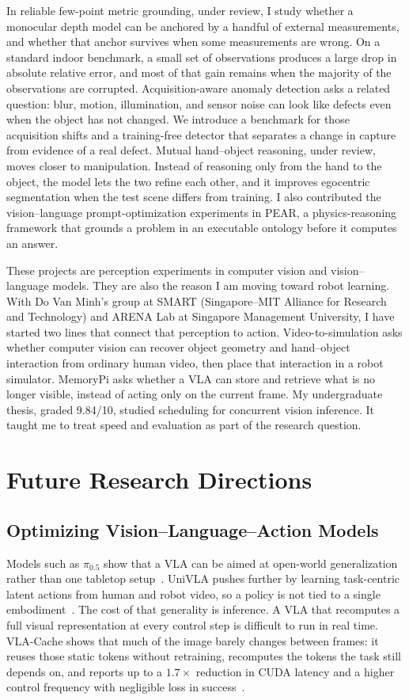 \documentclass[11pt]{article}
\begin{document}
In reliable few-point metric grounding, under review, I study whether a monocular depth model can be anchored by a handful of external measurements, and whether that anchor survives when some measurements are wrong. On a standard indoor benchmark, a small set of observations produces a large drop in absolute relative error, and most of that gain remains when the majority of the observations are corrupted. Acquisition-aware anomaly detection asks a related question: blur, motion, illumination, and sensor noise can look like defects even when the object has not changed. We introduce a benchmark for those acquisition shifts and a training-free detector that separates a change in capture from evidence of a real defect. Mutual hand--object reasoning, under review, moves closer to manipulation. Instead of reasoning only from the hand to the object, the model lets the two refine each other, and it improves egocentric segmentation when the test scene differs from training. I also contributed the vision--language prompt-optimization experiments in PEAR, a physics-reasoning framework that grounds a problem in an executable ontology before it computes an answer.

These projects are perception experiments in computer vision and vision--language models. They are also the reason I am moving toward robot learning. With Do Van Minh's group at SMART (Singapore--MIT Alliance for Research and Technology) and ARENA Lab at Singapore Management University, I have started two lines that connect that perception to action. Video-to-simulation asks whether computer vision can recover object geometry and hand--object interaction from ordinary human video, then place that interaction in a robot simulator. MemoryPi asks whether a VLA can store and retrieve what is no longer visible, instead of acting only on the current frame. My undergraduate thesis, graded 9.84/10, studied scheduling for concurrent vision inference. It taught me to treat speed and evaluation as part of the research question.

\section*{Future Research Directions}

\subsection*{Optimizing Vision--Language--Action Models}

Models such as $\pi_{0.5}$ show that a VLA can be aimed at open-world generalization rather than one tabletop setup~\cite{black2025pi05}. UniVLA pushes further by learning task-centric latent actions from human and robot video, so a policy is not tied to a single embodiment~\cite{bu2025univla}. The cost of that generality is inference. A VLA that recomputes a full visual representation at every control step is difficult to run in real time. VLA-Cache shows that much of the image barely changes between frames: it reuses those static tokens without retraining, recomputes the tokens the task still depends on, and reports up to a $1.7\times$ reduction in CUDA latency and a higher control frequency with negligible loss in success~\cite{xu2025vlacache}.
\end{document}
